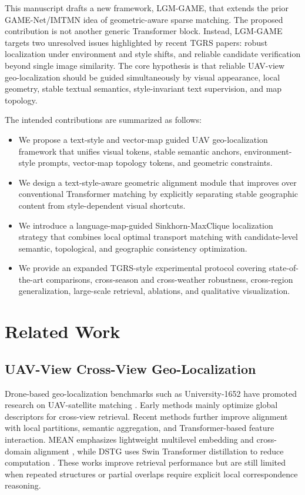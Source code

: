 \documentclass[journal]{IEEEtran}
\begin{document}
This manuscript drafts a new framework, LGM-GAME, that extends the prior GAME-Net/IMTMN idea of geometric-aware sparse matching. The proposed contribution is not another generic Transformer block. Instead, LGM-GAME targets two unresolved issues highlighted by recent TGRS papers: robust localization under environment and style shifts, and reliable candidate verification beyond single image similarity. The core hypothesis is that reliable UAV-view geo-localization should be guided simultaneously by visual appearance, local geometry, stable textual semantics, style-invariant text supervision, and map topology.

The intended contributions are summarized as follows:
\begin{itemize}
  \item We propose a text-style and vector-map guided UAV geo-localization framework that unifies visual tokens, stable semantic anchors, environment-style prompts, vector-map topology tokens, and geometric constraints.
  \item We design a text-style-aware geometric alignment module that improves over conventional Transformer matching by explicitly separating stable geographic content from style-dependent visual shortcuts.
  \item We introduce a language-map-guided Sinkhorn-MaxClique localization strategy that combines local optimal transport matching with candidate-level semantic, topological, and geographic consistency optimization.
  \item We provide an expanded TGRS-style experimental protocol covering state-of-the-art comparisons, cross-season and cross-weather robustness, cross-region generalization, large-scale retrieval, ablations, and qualitative visualization.
\end{itemize}

\section{Related Work}

\subsection{UAV-View Cross-View Geo-Localization}
Drone-based geo-localization benchmarks such as University-1652 have promoted research on UAV-satellite matching \cite{university1652}. Early methods mainly optimize global descriptors for cross-view retrieval. Recent methods further improve alignment with local partitions, semantic aggregation, and Transformer-based feature interaction. MEAN emphasizes lightweight multilevel embedding and cross-domain alignment \cite{mean2025}, while DSTG uses Swin Transformer distillation to reduce computation \cite{dstg2025}. These works improve retrieval performance but are still limited when repeated structures or partial overlaps require explicit local correspondence reasoning.
\end{document}
